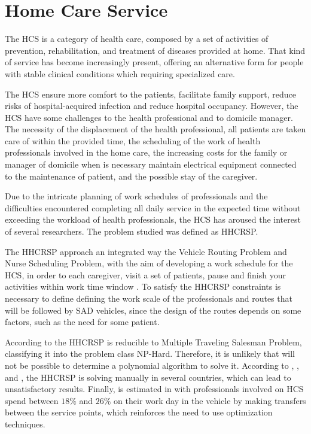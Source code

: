 \section{Home Care Service}
The \ac{HCS} is a category of health care, composed by a set of activities of prevention, rehabilitation, and treatment of diseases provided at home. That kind of service has become increasingly present, offering an alternative form for people with stable clinical conditions which requiring specialized care.

The \ac{HCS} ensure more comfort to the patients, facilitate family support, reduce risks of hospital-acquired infection and reduce hospital occupancy.  
However, the \ac{HCS} have some challenges to the health professional and to domicile manager. The necessity of the displacement of the health professional, all patients are taken care of within the provided time, the scheduling of the work of health professionals involved in the home care, the increasing costs for the family or manager of domicile when  is necessary maintain electrical equipment connected to the maintenance of patient, and the possible stay of the caregiver.

Due to the intricate planning of work schedules of professionals and the difficulties encountered completing all daily service in the expected time without exceeding the workload of health professionals, the \ac{HCS} has aroused the interest of several researchers. The problem studied was defined as \ac{HHCRSP}. 

The \ac{HHCRSP} approach an integrated way the Vehicle Routing Problem and Nurse Scheduling Problem, with the aim of developing a work schedule for the \ac{HCS}, in order to each caregiver, visit a set of patients, pause and finish your activities within work time window \cite{trabelsi:2012}. 
To satisfy the \ac{HHCRSP} constraints is necessary to define defining the work scale of the professionals and routes that will be followed by SAD vehicles, since the design of the routes depends on some factors, such as the need for some patient.

According to \cite{Kergosien:2009} the \ac{HHCRSP} is reducible to Multiple Traveling Salesman Problem, classifying it into the problem class NP-Hard. Therefore, it is unlikely that will not be possible to determine a polynomial algorithm to solve it.
According to \cite{cheng:98}, \cite{bachouch:2010},\cite{tozlu:2016} and \cite{cattafi:2012}, the \ac{HHCRSP} is solving manually in several countries, which can lead to unsatisfactory results.
Finally, is estimated in \cite{holm:2014} with professionals involved on \ac{HCS} spend between $18 \%$ and $26\%$ on their work day in the vehicle by making transfers between the service points, which reinforces the need to use optimization techniques.

